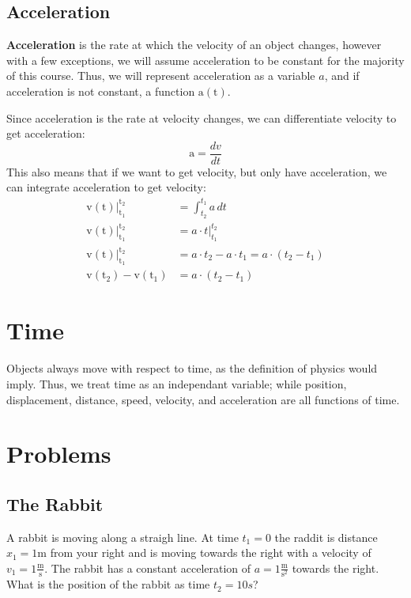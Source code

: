 \documentclass{article}
\newcommand{\diff}[1]{\frac{#1}{dt}}
\begin{document}
	\subsection{Acceleration}
	\textbf{Acceleration} is the rate at which the velocity of an object changes, however with a few exceptions,
	we will assume acceleration to be constant for the majority of this course. Thus, we will represent
	acceleration as a variable $a$, and if acceleration is not constant, a function $\mathrm{a(t)}$.

	Since acceleration is the rate at velocity changes, we can differentiate velocity to get acceleration:
	\[\mathrm{a} = \diff{dv}\]
	This also means that if we want to get velocity, but only have acceleration, we can integrate acceleration to get
	velocity:
	\begin{align*}
	\mathrm{v(t)\biggr\rvert_{t_1}^{t_2}} & = \int_{t_2}^{t_1}a\,dt\\
	\mathrm{v(t)\biggr\rvert_{t_1}^{t_2}} & = a\cdot t\biggr\rvert_{t_1}^{t_2}\\
	\mathrm{v(t)\biggr\rvert_{t_1}^{t_2}} & = a\cdot t_2 - a \cdot t_1 = a\cdot (t_2-t_1)\\
	\mathrm{v(t_2)-v(t_1)} & = a\cdot(t_2 - t_1)
	\end{align*}
	\section{Time}
	Objects always move with respect to time, as the definition of physics would imply. Thus, we treat time as an independant variable; while position, displacement,
	distance, speed, velocity, and acceleration are all functions of time.
	\section{Problems}
	\subsection{The Rabbit}
	A rabbit is moving along a straigh line. At time $t_1=0$ the raddit is distance $x_1=1\mathrm{m}$ from your right
	and is moving towards the right with a velocity of $v_1=1\mathrm{\frac{m}{s}}$. The rabbit has a constant acceleration
	of $a=1\mathrm{\frac{m}{s^2}}$ towards the right. What is the position of the rabbit as time $t_2=10s$?
\end{document}
